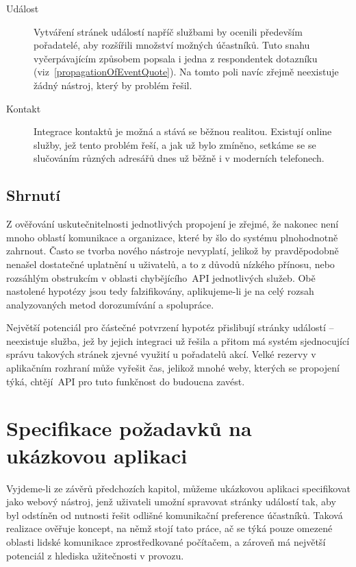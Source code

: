 \documentclass[12pt,oneside,final]{fithesis2}
\begin{document}
\begin{description}
    \item[Událost]
        Vytváření stránek událostí napříč službami by ocenili především pořadatelé, aby rozšířili množství možných účastníků. Tuto snahu vyčerpávajícím způsobem popsala i jedna z respondentek dotazníku (viz~\ref{propagationOfEventQuote}). Na tomto poli navíc zřejmě neexistuje žádný nástroj, který by problém řešil.

    \item[Kontakt]
        Integrace kontaktů je možná a stává se běžnou realitou. Existují online služby, jež tento problém řeší, a jak už bylo zmíněno, setkáme se se slučováním různých adresářů dnes už běžně i v moderních telefonech.
\end{description}

\section{Shrnutí}
Z ověřování uskutečnitelnosti jednotlivých propojení je zřejmé, že nakonec není mnoho oblastí komunikace a organizace, které by šlo do systému plnohodnotně zahrnout. Často se tvorba nového nástroje nevyplatí, jelikož by pravděpodobně nenašel dostatečné uplatnění u uživatelů, a to z důvodů nízkého přínosu, nebo rozsáhlým obstrukcím v oblasti chybějícího~API jednotlivých služeb. Obě nastolené hypotézy jsou tedy falzifikovány, aplikujeme-li je na celý rozsah analyzovaných metod dorozumívání a spolupráce.

Největší potenciál pro částečné potvrzení hypotéz přislibují stránky událostí -- neexistuje služba, jež by jejich integraci už řešila a přitom má systém sjednocující správu takových stránek zjevné využití u pořadatelů akcí. Velké rezervy v aplikačním rozhraní může vyřešit čas, jelikož mnohé weby, kterých se propojení týká, chtějí~API pro tuto funkčnost do budoucna zavést.


\chapter{Specifikace požadavků na ukázkovou aplikaci}
Vyjdeme-li ze závěrů předchozích kapitol, můžeme ukázkovou aplikaci specifikovat jako webový nástroj, jenž uživateli umožní spravovat stránky událostí tak, aby byl odstíněn od nutnosti řešit odlišné komunikační preference účastníků. Taková realizace ověřuje koncept, na němž stojí tato práce, ač se týká pouze omezené oblasti lidské komunikace zprostředkované počítačem, a zároveň má největší potenciál z hlediska užitečnosti v provozu.
\end{document}

